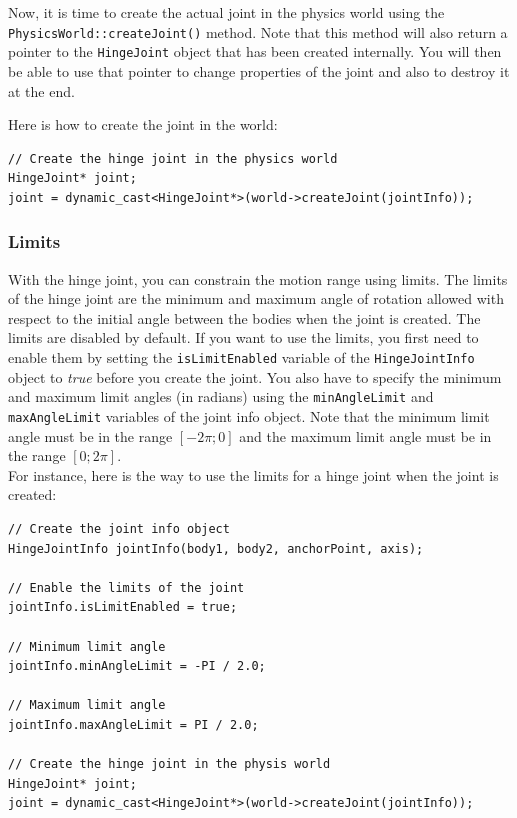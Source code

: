 \documentclass[a4paper,12pt]{article}
\begin{document}
    \vspace{0.6cm}

    \begin{sloppypar}
    Now, it is time to create the actual joint in the physics world using the \texttt{PhysicsWorld::createJoint()} method.
    Note that this method will also return a pointer to the \texttt{HingeJoint} object that has been created internally. You will then
    be able to use that pointer to change properties of the joint and also to destroy it at the end. \\
    \end{sloppypar}

    Here is how to create the joint in the world: \\

    \begin{lstlisting}
// Create the hinge joint in the physics world
HingeJoint* joint;
joint = dynamic_cast<HingeJoint*>(world->createJoint(jointInfo));
  \end{lstlisting}

     \subsubsection{Limits}

     With the hinge joint, you can constrain the motion range using limits. The limits of the hinge joint are the minimum and maximum angle of rotation allowed with respect to the initial
     angle between the bodies when the joint is created. The limits are disabled by default. If you want to use the limits, you first need to enable them by setting the
     \texttt{isLimitEnabled} variable of the \texttt{HingeJointInfo} object to \emph{true} before you create the joint. You also have to specify the minimum and maximum limit
     angles (in radians) using the \texttt{minAngleLimit} and \texttt{maxAngleLimit} variables of the joint info object. Note that the minimum limit angle must be in the
     range $[ -2 \pi; 0 ]$ and the maximum limit angle must be in the range $[ 0; 2 \pi ]$. \\

     For instance, here is the way to use the limits for a hinge joint when the joint is created: \\

     \begin{lstlisting}
// Create the joint info object
HingeJointInfo jointInfo(body1, body2, anchorPoint, axis);

// Enable the limits of the joint
jointInfo.isLimitEnabled = true;

// Minimum limit angle
jointInfo.minAngleLimit = -PI / 2.0;

// Maximum limit angle
jointInfo.maxAngleLimit = PI / 2.0;

// Create the hinge joint in the physis world
HingeJoint* joint;
joint = dynamic_cast<HingeJoint*>(world->createJoint(jointInfo));
  \end{lstlisting}
\end{document}
